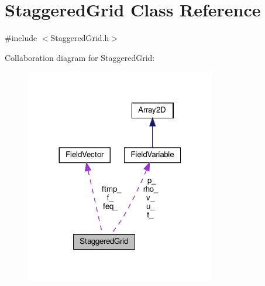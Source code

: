 \hypertarget{classStaggeredGrid}{}\section{Staggered\+Grid Class Reference}
\label{classStaggeredGrid}


{\ttfamily \#include $<$Staggered\+Grid.\+h$>$}



Collaboration diagram for Staggered\+Grid\+:\nopagebreak
\begin{figure}[H]
\begin{center}
\leavevmode
\includegraphics[width=236pt]{classStaggeredGrid__coll__graph}
\end{center}
\end{figure}
